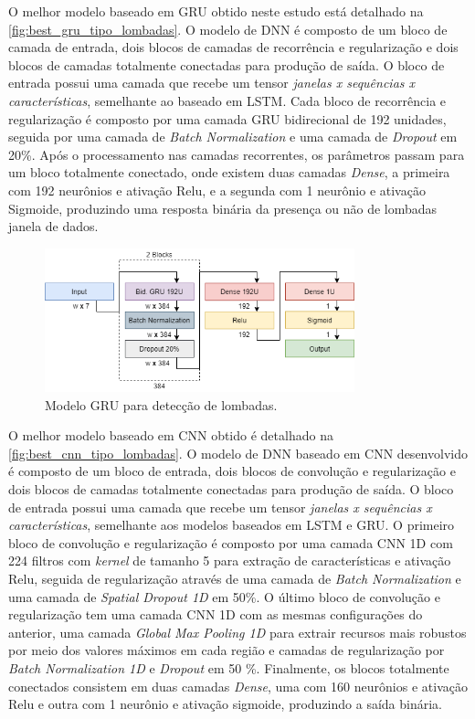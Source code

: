 O melhor modelo baseado em GRU obtido neste estudo está detalhado na \autoref{fig:best_gru_tipo_lombadas}. O modelo de DNN é composto de um bloco de camada de entrada, dois blocos de camadas de recorrência e regularização e dois blocos de camadas totalmente conectadas para produção de saída. O bloco de entrada possui uma camada que recebe um tensor \emph{janelas x sequências x características}, semelhante ao baseado em LSTM. Cada bloco de recorrência e regularização é composto por uma camada GRU bidirecional de 192 unidades, seguida por uma camada de \textit{Batch Normalization} e uma camada de \textit{Dropout} em 20\%. Após o processamento nas camadas recorrentes, os parâmetros passam para um bloco totalmente conectado, onde existem duas camadas \textit{Dense}, a primeira com 192 neurônios e ativação Relu, e a segunda com 1 neurônio e ativação Sigmoide, produzindo uma resposta binária da presença ou não de lombadas janela de dados.

\begin{figure}[h!]
  \centering
  \caption{Modelo GRU para detecção de lombadas.}
  \label{fig:best_gru_tipo_lombadas}
  \includegraphics[width=0.8\textwidth]{figuras/fig_41.png}
\end{figure}

O melhor modelo baseado em CNN obtido é detalhado na \autoref{fig:best_cnn_tipo_lombadas}. O modelo de DNN baseado em CNN desenvolvido é composto de um bloco de entrada, dois blocos de convolução e regularização e dois blocos de camadas totalmente conectadas para produção de saída. O bloco de entrada possui uma camada que recebe um tensor \emph{janelas x sequências x características}, semelhante aos modelos baseados em LSTM e GRU. O primeiro bloco de convolução e regularização é composto por uma camada CNN 1D com 224 filtros com \textit{kernel} de tamanho 5 para extração de características e ativação Relu, seguida de regularização através de uma camada de \textit{Batch Normalization} e uma camada de \textit{Spatial Dropout 1D} em 50\%. O último bloco de convolução e regularização tem uma camada CNN 1D com as mesmas configurações do anterior, uma camada \textit{Global Max Pooling 1D} para extrair recursos mais robustos por meio dos valores máximos em cada região \cite{Yang2018,Wang2019} e camadas de regularização por \textit{Batch Normalization 1D} e \textit{Dropout} em 50 \%. Finalmente, os blocos totalmente conectados consistem em duas camadas \textit{Dense}, uma com 160 neurônios e ativação Relu e outra com 1 neurônio e ativação sigmoide, produzindo a saída binária.

